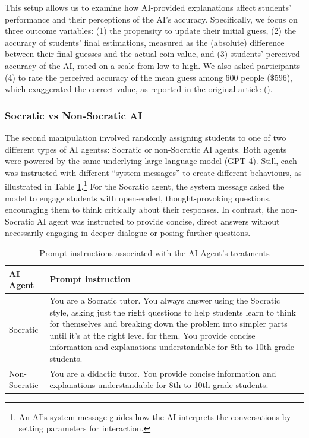 \documentclass[
  11pt,
]{article}
\begin{document}
This setup allows us to examine how AI-provided explanations affect students' performance and their perceptions of the AI's accuracy. Specifically, we focus on three outcome variables: (1) the propensity to update their initial guess, (2) the accuracy of students' final estimations, measured as the (absolute) difference between their final guesses and the actual coin value, and (3) students' perceived accuracy of the AI, rated on a scale from low to high. We also asked participants (4) to rate the perceived accuracy of the mean guess among 600 people (\$596), which exaggerated the correct value, as reported in the original article ().

\subsubsection{Socratic vs Non-Socratic AI}\label{socratic-vs-non-socratic-ai}

The second manipulation involved randomly assigning students to one of two different types of AI agentss: Socratic or non-Socratic AI agents. Both agents were powered by the same underlying large language model (GPT-4). Still, each was instructed with different ``system messages'' to create different behaviours, as illustrated in Table \ref{tab:prompts}.\footnote{An AI's system message guides how the AI interprets the conversations by setting parameters for interaction.} For the Socratic agent, the system message asked the model to engage students with open-ended, thought-provoking questions, encouraging them to think critically about their responses. In contrast, the non-Socratic AI agent was instructed to provide concise, direct answers without necessarily engaging in deeper dialogue or posing further questions.

\begin{table}

\caption{\label{tab:prompts}Prompt instructions associated with the AI Agent's treatments}
\centering
\begin{tabular}[t]{l>{\raggedright\arraybackslash}p{4in}}
\toprule
AI Agent & Prompt instruction\\
\midrule
Socratic & You are a Socratic tutor. You always answer using the Socratic style, asking just the right questions to help students learn to think for themselves and breaking down the problem into simpler parts until it's at the right level for them. You provide concise information and explanations understandable for 8th to 10th grade students.\\
Non-Socratic & You are a didactic tutor. You provide concise information and explanations understandable for 8th to 10th grade students.\\
\bottomrule
\end{tabular}
\end{table}
\end{document}
